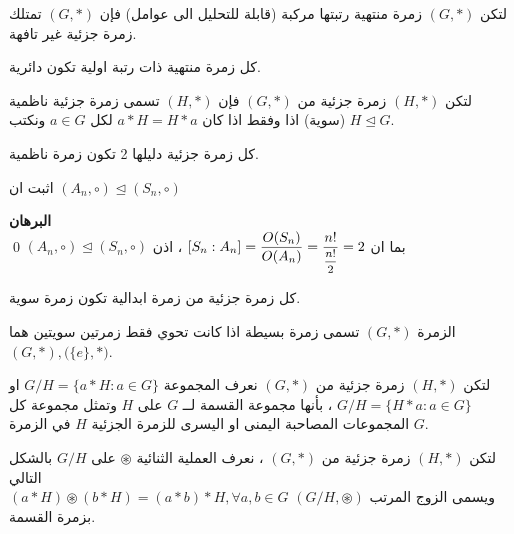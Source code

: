  \begin{corollary}
 	لتكن $(G, *)$ زمرة منتهية رتبتها مركبة (قابلة للتحليل الى عوامل) فإن $(G, *)$ تمتلك زمرة جزئية غير تافهة.
 \end{corollary}
 
 \begin{corollary}
 	كل زمرة منتهية ذات رتبة اولية تكون دائرية.
 \end{corollary}
 
 
 \begin{definition}
 	لتكن $(H, *)$ زمرة جزئية من $(G, *)$ فإن $(H, *)$ تسمى زمرة جزئية ناظمية (سوية) اذا وفقط اذا كان $a*H = H*a$ لكل $a\in G$ ونكتب $ H \trianglelefteq G$.
 \end{definition}
 
 \begin{example}
 	كل زمرة جزئية دليلها 2 تكون زمرة ناظمية.
 \end{example}

 
 \begin{example}
 	اثبت ان 
 	$(A_n, \circ) \trianglelefteq (S_n, \circ)$ 
 \end{example}
 \noindent
 \textbf{البرهان}\\
 \noindent
 بما ان 
 $[S_n : A_n] = \dfrac{O(S_n)}{O(A_n) } = \dfrac{n!}{\mfrac{n!}{2}} = 2$ ، 
 اذن  	$(A_n, \circ) \trianglelefteq (S_n, \circ)$ \qed
 
 \begin{theorem}
 	كل زمرة جزئية من زمرة ابدالية تكون زمرة سوية.
 \end{theorem}

  
  \begin{definition}
  	الزمرة $(G, *)$ تسمى زمرة بسيطة اذا كانت تحوي فقط زمرتين سويتين هما 
  	$(G, *) , \big(\{e\}, *\big)$.
  \end{definition}
  
  
  \begin{definition}
  	لتكن $(H, *)$ زمرة جزئية من $(G, *)$ نعرف المجموعة
  $G/H = \{a*H : a\in G\}$  او $ G/H = \{H*a : a\in G\}$ ، بأنها مجموعة القسمة لــ $G$ على $H$ وتمثل مجموعة كل المجموعات المصاحبة اليمنى او اليسرى للزمرة الجزئية $H$ في الزمرة $G$.
  \end{definition}
  
  \begin{definition}
  	لتكن $(H, *)$ زمرة جزئية من $(G , *)$ ، نعرف العملية الثنائية $\circledast$ على $G/H$ بالشكل التالي\\
  	$
  	(a*H)\circledast (b*H) = (a*b) *H, \forall a, b\in G
  	$
  	ويسمى الزوج المرتب $(G/H, \circledast)$ بزمرة القسمة.
  \end{definition}
  
